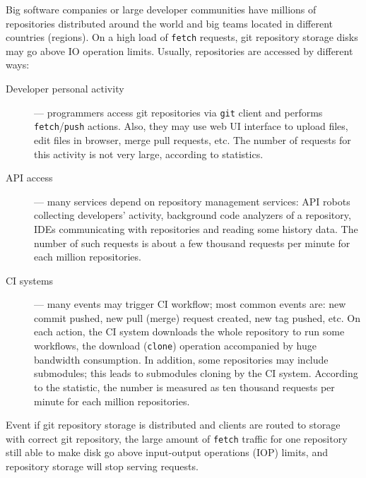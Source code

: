 \documentclass[acmlarge, screen, nonacm]{acmart}
\newcommand{\code}[1]{\texttt{#1}}
\begin{document}
Big software companies or large developer communities have
millions of repositories distributed around the world and big teams located in different countries
(regions). On a high load of \code{fetch} requests, git repository storage disks may go above IO operation limits.
Usually, repositories are accessed by different ways:
\begin{description}
  \item[Developer personal activity] --- programmers access git repositories via
    \code{git} client and performs \code{fetch}/\code{push} actions. Also, they
    may use web UI interface to upload files, edit files in browser, merge pull requests, etc.
    The number of requests for this activity is not very large, according to statistics.
  \item[API access] --- many services depend on repository management services: API robots
    collecting developers' activity, background code analyzers of a repository, IDEs communicating
    with repositories and reading some history data. The number of such requests is about
    a few thousand requests per minute for each million repositories.
  \item[CI systems] --- many events may trigger CI workflow; most common events are:
    new commit pushed, new pull (merge) request created, new tag pushed, etc.
    On each action, the CI system downloads the whole repository to run some workflows,
    the download (\code{clone}) operation accompanied by huge bandwidth consumption.
    In addition, some repositories may include submodules; this leads to submodules cloning by the CI
    system. According to the statistic, the number is measured as ten thousand requests per minute
    for each million repositories.
\end{description}

Event if git repository storage is distributed and clients are routed to storage with
correct git repository, the large amount of \code{fetch} traffic for one repository still able to
make disk go above input-output operations (IOP) limits, and repository storage will stop
serving requests.
\end{document}

